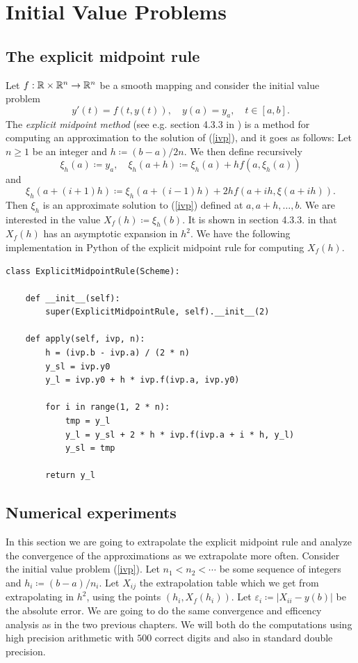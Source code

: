 \chapter{Initial Value Problems}

\section{The explicit midpoint rule}

Let \(f: \mathbb{R}\times \mathbb{R}^n \rightarrow \mathbb{R}^n\) be a smooth mapping and consider the initial value problem 
\begin{equation}\label{ivp}
y'(t) = f(t, y(t)), \quad y(a) = y_a, \quad t\in [a,b].
\end{equation}
The {\it explicit midpoint method} (see e.g. section 4.3.3 in \cite{db})  is a method for computing an approximation to the solution of (\ref{ivp}), and it goes as follows: Let \(n\geq 1\) be an integer and \(h\coloneqq (b-a)/2n\). We then define recursively
\[
\xi_h(a) \coloneqq y_a, \quad \xi_h(a+h) \coloneqq \xi_h(a) + hf(a, \xi_h(a))
\]
and
\[
\xi_h(a + (i+1)h) \coloneqq \xi_h(a+(i-1)h) + 2hf(a+ih, \xi(a+ih)).
\]
Then \(\xi_h\) is an approximate solution to (\ref{ivp}) defined at \(a, a+h,\ldots ,b\). We are interested in the value \(X_f(h)\coloneqq \xi_h(b)\). It is shown in section 4.3.3. in \cite{db} that \(X_f(h)\) has an asymptotic expansion in \(h^2\). We have the following implementation in Python of the explicit midpoint rule for computing \(X_f(h)\).

\begin{verbatim}
class ExplicitMidpointRule(Scheme):

	def __init__(self):
		super(ExplicitMidpointRule, self).__init__(2)

	def apply(self, ivp, n):
		h = (ivp.b - ivp.a) / (2 * n)
		y_sl = ivp.y0
		y_l = ivp.y0 + h * ivp.f(ivp.a, ivp.y0)

		for i in range(1, 2 * n):
			tmp = y_l
			y_l = y_sl + 2 * h * ivp.f(ivp.a + i * h, y_l)
			y_sl = tmp

		return y_l
\end{verbatim}

\section{Numerical experiments}

In this section we are going to extrapolate the explicit midpoint rule and analyze the convergence of the approximations as we extrapolate more often. Consider the initial value problem (\ref{ivp}). Let \(n_1 < n_2 < \cdots\) be some sequence of integers and \(h_i \coloneqq (b-a) / n_i\). Let \(X_{ij}\) the extrapolation table which we get from extrapolating in \(h^2\), using the points \((h_i,X_f(h_i))\). Let \(\varepsilon_i \coloneqq |X_{ii} - y(b)|\) be the absolute error. We are going to do the same convergence and efficency analysis as in the two previous chapters. We will both do the computations using high precision arithmetic with \(500\) correct digits and also in standard double precision.\\

